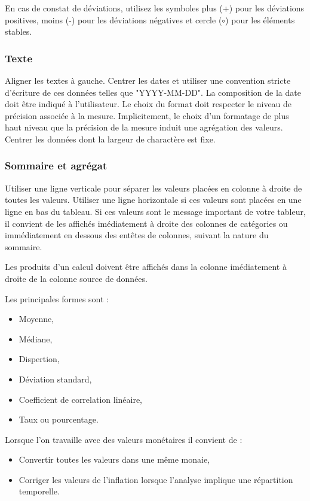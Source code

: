 \documentclass[a4paper,12pt]{article}
\begin{document}
\begin{multicols}{2}
En cas de constat de déviations, utilisez les symboles plus (+) pour les déviations positives, moins (-) pour les déviations négatives et cercle (\(\circ\)) pour les éléments stables. \autocite{andreaskrauseBestPracticesData2024}
\subsubsection*{Texte}
\label{sec:org948ddf0}
Aligner les textes à gauche.
Centrer les dates et utiliser une convention stricte d'écriture de ces données telles que "YYYY-MM-DD". \autocite{ISO8601-1DateHeureRepresentations2019} La composition de la date doit être indiqué à l'utilisateur. Le choix du format doit respecter le niveau de précision associée à la mesure. Implicitement, le choix d'un formatage de plus haut niveau que la précision de la mesure induit une agrégation des valeurs.
Centrer les données dont la largeur de charactère est fixe.
\subsubsection*{Sommaire et agrégat}
\label{sec:org881f4de}
Utiliser une ligne verticale pour séparer les valeurs placées en colonne à droite de toutes les valeurs.
Utiliser une ligne horizontale si ces valeurs sont placées en une ligne en bas du tableau.
Si ces valeurs sont le message important de votre tableur, il convient de les affichés imédiatement à droite des colonnes de catégories ou immédiatement en dessous des entêtes de colonnes, suivant la nature du sommaire.

Les produits d'un calcul doivent être affichés dans la colonne imédiatement à droite de la colonne source de données.

Les principales formes sont :
\begin{itemize}
\item Moyenne,
\item Médiane,
\item Dispertion,
\item Déviation standard,
\item Coefficient de correlation linéaire,
\item Taux ou pourcentage.
\end{itemize}

Lorsque l'on travaille avec des valeurs monétaires il convient de :
\begin{itemize}
\item Convertir toutes les valeurs dans une même monaie,
\item Corriger les valeurs de l'inflation lorsque l'analyse implique une répartition temporelle.
\end{itemize}

\end{multicols}
\end{document}
